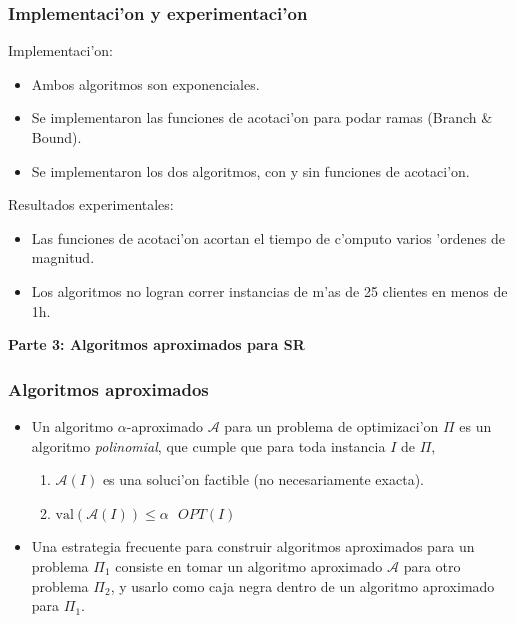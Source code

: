 \documentclass{beamer}
\newcommand{\probl}[1]{\textnormal{\textsf{#1}}}
\begin{document}
\begin{frame}
\frametitle{Implementaci'on y experimentaci'on}

Implementaci'on:
\pause
\begin{itemize}
	\item Ambos algoritmos son exponenciales.
	\pause
	\item Se implementaron las funciones de acotaci'on para podar ramas (Branch \& Bound).
	\pause
	\item Se implementaron los dos algoritmos, con y sin funciones de acotaci'on.
\end{itemize}

\pause

\vspace{3mm}
Resultados experimentales:
\pause
\begin{itemize}
	\item Las funciones de acotaci'on acortan el tiempo de c'omputo varios 'ordenes de magnitud.
	\pause
	\item Los algoritmos no logran correr instancias de m'as de 25 clientes en menos de 1h.
\end{itemize}
\end{frame}

\begin{frame}
\begin{center}
\begin{Large}
\textbf{Parte 3: Algoritmos aproximados para \probl{SR}}
\end{Large}
\end{center}
\end{frame}

\begin{frame}
\frametitle{Algoritmos aproximados}

\pause

\begin{itemize}
	\item Un algoritmo $\alpha$-aproximado $\mathcal{A}$ para un problema de optimizaci'on $\Pi$ es un algoritmo \emph{polinomial}, que cumple que para toda instancia $I$ de $\Pi$,
	
	\pause
	
	\begin{enumerate}
		\item $\mathcal{A}(I)$ es una soluci'on factible (no necesariamente exacta).
		\pause
		\item $\text{val}(\mathcal{A}(I)) \leq \alpha\text{ }OPT(I)$
	\end{enumerate}
	
	\pause
	
	\item Una estrategia frecuente para construir algoritmos aproximados para un problema $\Pi_1$ consiste en tomar un algoritmo aproximado $\mathcal{A}$ para otro problema $\Pi_2$, y usarlo como caja negra dentro de un algoritmo aproximado para $\Pi_1$.
\end{itemize}
\end{frame}
\end{document}
